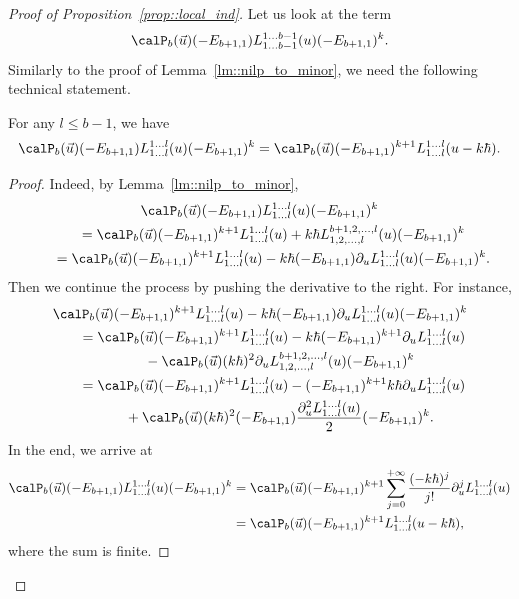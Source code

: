 \begin{proof}[Proof of Proposition~\ref{prop::local_ind}]
		Let us look at the term
		\[
		\calP_{b}(\vec{u})(-E_{b+1,1}) L_{1\dots b-1}^{1\dots b-1}(u) (-E_{b+1,1})^k.
		\]
		Similarly to the proof of Lemma~\ref{lm::nilp_to_minor}, we need the following technical statement.
		\begin{Lemma}
			\label{lm::gt_push_right_shift}
			For any $l\leq b-1$, we have
			\[
			\calP_{b}(\vec{u})(-E_{b+1,1}) L_{1\dots l}^{1\dots l}(u) (-E_{b+1,1})^k = \calP_{b}(\vec{u}) (-E_{b+1,1})^{k+1} L_{1\dots l}^{1\dots l}(u-k\hbar).
			\]
			\begin{proof}
				Indeed, by Lemma~\ref{lm::nilp_to_minor},
				\begin{gather*}
					\calP_{b}(\vec{u})(-E_{b+1,1}) L_{1\dots l}^{1\dots l}(u) (-E_{b+1,1})^k  \\
					\qquad= \calP_{b}(\vec{u})(-E_{b+1,1})^{k+1} L_{1\dots l}^{1\dots l}(u) + k\hbar L_{1,2,\dots,l}^{b+1,2,\dots,l}(u) (-E_{b+1,1})^{k} \\
					\qquad=\calP_{b}(\vec{u})(-E_{b+1,1})^{k+1} L_{1\dots l}^{1\dots l}(u) - k\hbar (-E_{b+1,1}) \partial_u L_{1\dots l}^{1\dots l}(u) (-E_{b+1,1})^k.
				\end{gather*}
				Then we continue the process by pushing the derivative to the right. For instance,
				\begin{gather*}
					\calP_{b}(\vec{u})(-E_{b+1,1})^{k+1} L_{1\dots l}^{1\dots l}(u) - k\hbar (-E_{b+1,1}) \partial_u L_{1\dots l}^{1\dots l}(u) (-E_{b+1,1})^k \\
					\qquad= \calP_{b}(\vec{u})(-E_{b+1,1})^{k+1} L_{1\dots l}^{1\dots l}(u) - k\hbar (-E_{b+1,1})^{k+1} \partial_u L_{1\dots l}^{1\dots l}(u) \\
					\phantom{\qquad=}{}- \calP_{b}(\vec{u})(k\hbar)^2 \partial_u L_{1,2,\dots,l}^{b+1,2,\dots,l}(u) (-E_{b+1,1})^k \\
					\qquad=\calP_{b}(\vec{u})(-E_{b+1,1})^{k+1} L_{1\dots l}^{1\dots l}(u) - (-E_{b+1,1})^{k+1} k\hbar \partial_u L_{1\dots l}^{1\dots l}(u) \\
					\phantom{\qquad=}{}+ \calP_{b}(\vec{u})(k\hbar)^2 (-E_{b+1,1}) \frac{\partial_u^2 L_{1\dots l}^{1\dots l}(u)}{2} (-E_{b+1,1})^k.
				\end{gather*}
				In the end, we arrive at
				\begin{align*}
					\calP_{b}(\vec{u})(-E_{b+1,1}) L_{1\dots l}^{1\dots l}(u) (-E_{b+1,1})^k
					={}&\calP_{b}(\vec{u}) (-E_{b+1,1})^{k+1} \sum\limits_{j=0}^{+\infty} \frac{(-k\hbar)^j}{j!} \partial_u^j L_{1\dots l}^{1\dots l}(u) \\
					={}&\calP_{b}(\vec{u}) (-E_{b+1,1})^{k+1} L_{1\dots l}^{1\dots l}(u-k\hbar),
				\end{align*}
				where the sum is finite.
			\end{proof}
		\end{Lemma}
		

\end{proof}

